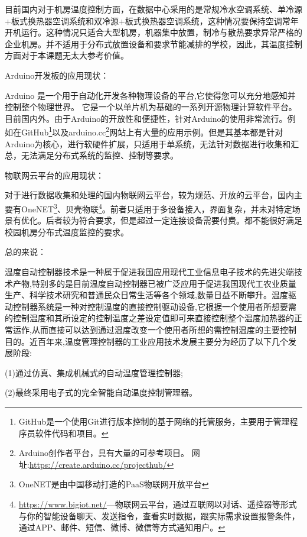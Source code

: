 目前国内对于机房温度控制方面，在数据中心采用的是常规冷水空调系统、单冷源+板式换热器空调系统和双冷源+板式换热器空调系统，这种情况要保持空调常年开机运行。这种情况只适合大型机房，机器集中放置，制冷与散热要求异常严格的企业机房。并不适用于分布式放置设备和要求节能减排的学校，因此，其温度控制方面对于本课题无太大参考价值。

Arduino开发板的应用现状：

Arduino 是一个用于自动化开发各种物理设备的平台,它使得您可以充分地感知并控制整个物理世界。 它是一个以单片机为基础的一系列开源物理计算软件平台。目前国内外。由于Arduino的开放性和便捷性，针对Arduino的使用非常流行。例如在GitHub\footnote{GitHub是一个使用Git进行版本控制的基于网络的托管服务，主要用于管理程序员软件代码和项目。}以及arduino.cc\footnote{Arduino创作者平台，具有大量的可参考项目。 网址:\url{https://create.arduino.cc/projecthub/} }网站上有大量的应用示例。但是其基本都是针对Arduino为核心，进行软硬件扩展，只适用于单系统，无法针对数据进行收集和汇总，无法满足分布式系统的监控、控制等要求。

物联网云平台的应用现状：

对于进行数据收集和处理的国内物联网云平台，较为规范、开放的云平台，国内主要有OneNET\footnote{OneNET是由中国移动打造的PaaS物联网开放平台}、贝壳物联\footnote{\url{https://www.bigiot.net/}---物联网云平台，通过互联网以对话、遥控器等形式与你的智能设备聊天、发送指令，查看实时数据，跟实际需求设置报警条件，通过APP、邮件、短信、微博、微信等方式通知用户。}。前者只适用于多设备接入，界面复杂，并未对特定场景有优化。后者较为符合要求，但是超过一定连接设备需要付费。都不能很好满足校园机房分布式温度监控的要求。

总的来说：

温度自动控制器技术是一种属于促进我国应用现代工业信息电子技术的先进尖端技术产物,特别多的是目前温度自动控制器已被广泛应用于促进我国现代工农业质量生产、科学技术研究和普通民众日常生活等各个领域,数量日益不断攀升。温度驱动控制器系统是一种对控制温度的直接控制驱动设备,它根据一个使用者所想要需的控制温度和其所设定的控制温度之差设定值即可来直接控制整个温度加热器的正常运作,从而直接可以达到通过温度改变一个使用者所想的需控制温度的主要控制目的。近百年来,温度管理控制器的工业应用技术发展主要分为经历了以下几个发展阶段:

(1)通过仿真、集成机械式的自动温度管理控制器;

(2)最终采用电子式的完全智能自动温度控制管理器。

